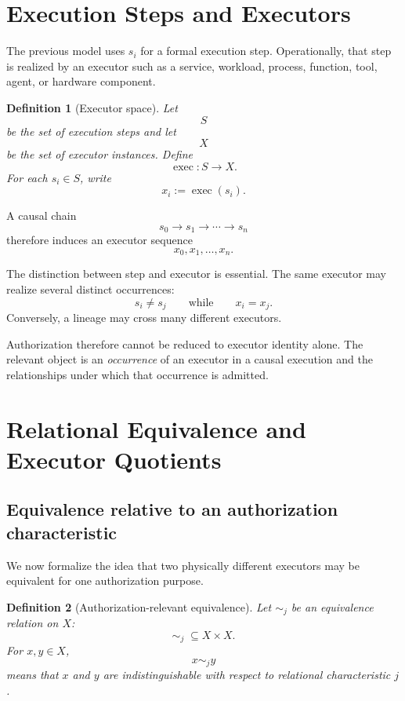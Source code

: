 \documentclass[10pt,twocolumn]{article}
\newcommand{\exec}{\operatorname{exec}}
\newtheorem{definition}{Definition}
\begin{document}
\section{Execution Steps and Executors}

The previous model uses \(s_i\) for a formal execution step. Operationally,
that step is realized by an executor such as a service, workload, process,
function, tool, agent, or hardware component.

\begin{definition}[Executor space]
Let
\[
S
\]
be the set of execution steps and let
\[
X
\]
be the set of executor instances. Define
\[
\exec:S\rightarrow X.
\]
For each \(s_i\in S\), write
\[
x_i:=\exec(s_i).
\]
\end{definition}

A causal chain
\[
s_0\rightarrow s_1\rightarrow\cdots\rightarrow s_n
\]
therefore induces an executor sequence
\[
x_0,x_1,\ldots,x_n.
\]

The distinction between step and executor is essential. The same executor may
realize several distinct occurrences:
\[
s_i\neq s_j
\qquad\text{while}\qquad
x_i=x_j.
\]
Conversely, a lineage may cross many different executors.

Authorization therefore cannot be reduced to executor identity alone. The
relevant object is an \emph{occurrence} of an executor in a causal execution and
the relationships under which that occurrence is admitted.

\section{Relational Equivalence and Executor Quotients}

\subsection{Equivalence relative to an authorization characteristic}

We now formalize the idea that two physically different executors may be
equivalent for one authorization purpose.

\begin{definition}[Authorization-relevant equivalence]
Let \(\sim_j\) be an equivalence relation on \(X\):
\[
\sim_j\;\subseteq X\times X.
\]
For \(x,y\in X\),
\[
x\sim_j y
\]
means that \(x\) and \(y\) are indistinguishable with respect to relational
characteristic \(j\).
\end{definition}
\end{document}
